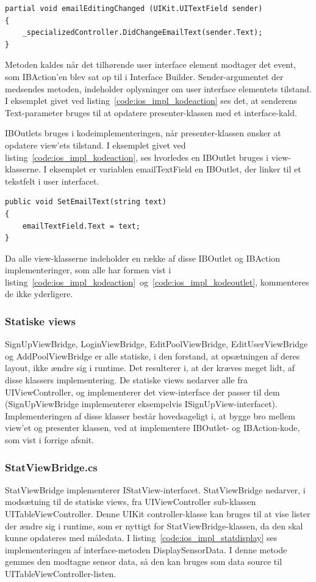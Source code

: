\begin{lstlisting}[caption={Kodeimplementering af en IBAction},label={code:ios_impl_kodeaction}]
partial void emailEditingChanged (UIKit.UITextField sender)
{
	_specializedController.DidChangeEmailText(sender.Text);
}
\end{lstlisting}

Metoden kaldes når det tilhørende user interface element modtager det event, som IBAction'en blev sat op til i Interface Builder. Sender-argumentet der medsendes metoden, indeholder oplysninger om user interface elementets tilstand. I eksemplet givet ved listing~\ref{code:ios_impl_kodeaction} ses det, at senderens Text-parameter bruges til at opdatere presenter-klassen med et interface-kald.

IBOutlets bruges i kodeimplementeringen, når presenter-klassen ønsker at opdatere view'ets tilstand. I eksemplet givet ved listing~\ref{code:ios_impl_kodeaction}, ses hvorledes en IBOutlet bruges i view-klasserne. I eksemplet er variablen emailTextField en IBOutlet, der linker til et tekstfelt i user interfacet.

\begin{lstlisting}[caption={Brug af en IBOutlet i koden},label={code:ios_impl_kodeoutlet}]
public void SetEmailText(string text)
{
	emailTextField.Text = text;
}
\end{lstlisting}

Da alle view-klasserne indeholder en række af disse IBOutlet og IBAction implementeringer, som alle har formen vist i listing~\ref{code:ios_impl_kodeaction}~og~\ref{code:ios_impl_kodeoutlet}, kommenteres de ikke yderligere.

\subsubsection{Statiske views}
SignUpViewBridge, LoginViewBridge, EditPoolViewBridge, EditUserViewBridge og AddPoolViewBridge er alle statiske, i den forstand, at opsætningen af deres layout, ikke ændre sig i runtime. Det resulterer i, at der kræves meget lidt, af disse klassers implementering. De statiske views nedarver alle fra UIViewController, og implementerer det view-interface der passer til dem (SignUpViewBridge implementerer eksempelvis ISignUpView-interfacet). Implementeringen af disse klasser består hovedsageligt i, at bygge bro mellem view'et og presenter klassen, ved at implementere IBOutlet- og IBAction-kode, som vist i forrige afsnit. 

\subsubsection{StatViewBridge.cs}
StatViewBridge implementerer IStatView-interfacet. StatViewBridge nedarver, i modsætning til de statiske views, fra UIViewController sub-klassen UITableViewController. Denne UIKit controller-klasse kan bruges til at vise lister der ændre sig i runtime, som er nyttigt for StatViewBridge-klassen, da den skal kunne opdateres med måledata. I listing~\ref{code:ios_impl_statdisplay} ses implementeringen af interface-metoden DisplaySensorData. I denne metode gemmes den modtagne sensor data, så den kan bruges som data source til UITableViewController-listen.

